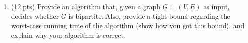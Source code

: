 \documentclass{article}
\begin{document}
\begin{enumerate}
\item (12 pts) Provide an algorithm that, given a graph $G=(V,E)$ as input, decides whether $G$ is
bipartite. Also, provide a tight bound regarding the worst-case running time of the algorithm (show
how you got this bound), and explain why your algorithm is correct.


\end{enumerate}
\end{document}
